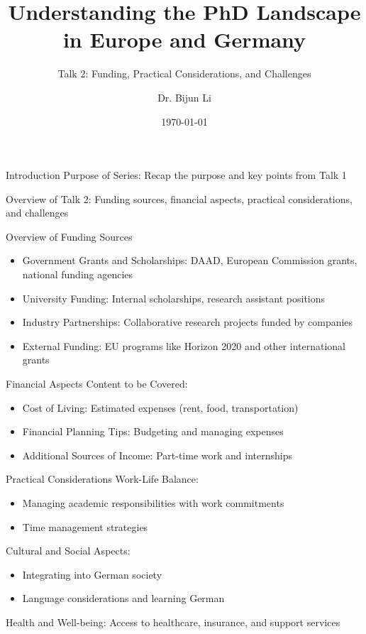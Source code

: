 \documentclass[10pt]{beamer}
\title{Understanding the PhD Landscape in Europe and Germany}
\subtitle{Talk 2: Funding, Practical Considerations, and Challenges}
\date{\today}
\author{Dr. Bijun Li}
\begin{document}
\maketitle


\begin{frame}[fragile]{Introduction}
Purpose of Series:
Recap the purpose and key points from Talk 1

Overview of Talk 2:
Funding sources, financial aspects, practical considerations, and challenges
\end{frame}

\begin{frame}[fragile]{Overview of Funding Sources}

\begin{itemize}
	\item Government Grants and Scholarships: DAAD, European Commission grants, national funding agencies
	\item University Funding:
Internal scholarships, research assistant positions
	\item Industry Partnerships:
Collaborative research projects funded by companies
	\item External Funding:
EU programs like Horizon 2020 and other international grants
\end{itemize}
  
\end{frame}

\begin{frame}{Financial Aspects}
Content to be Covered:
  \begin{itemize}
  	\item Cost of Living:
Estimated expenses (rent, food, transportation)
  	\item Financial Planning Tips:
Budgeting and managing expenses
  	\item Additional Sources of Income:
Part-time work and internships
  \end{itemize}
\end{frame}

\begin{frame}[fragile]{Practical Considerations}
Work-Life Balance:
\begin{itemize}
	\item Managing academic responsibilities with work commitments
	\item Time management strategies
\end{itemize}
Cultural and Social Aspects:
\begin{itemize}
	\item Integrating into German society
	\item Language considerations and learning German
\end{itemize}
Health and Well-being:
Access to healthcare, insurance, and support services

\end{frame}
\end{document}

